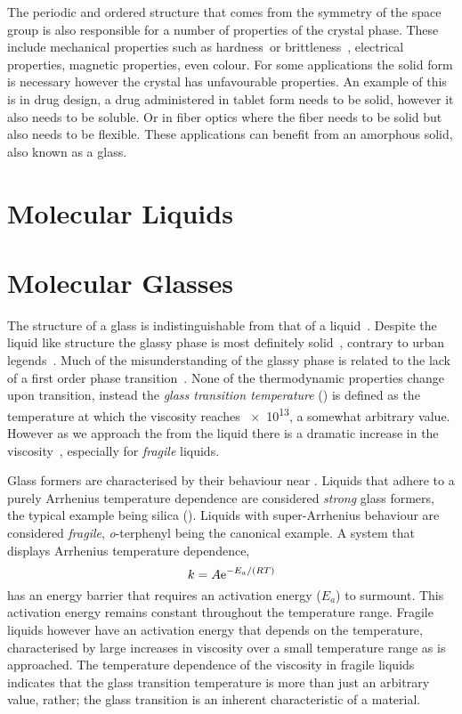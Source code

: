 
The periodic and ordered structure that comes from the symmetry of the space group is also responsible for a number of properties of the crystal phase. These include mechanical properties such as hardness~\tocite or brittleness~\tocite, electrical properties\tocite, magnetic properties\tocite, even colour\tocite. For some applications the solid form is necessary however the crystal has unfavourable properties. An example of this is in drug design, a drug administered in tablet form needs to be solid, however it also needs to be soluble\tocite. Or in fiber optics where the fiber needs to be solid but also needs to be flexible\tocite. These applications can benefit from an amorphous solid, also known as a glass.


\section{Molecular Liquids}






\section{Molecular Glasses}

The structure of a glass is indistinguishable from that of a liquid~\figref{}. Despite the liquid like structure the glassy phase is most definitely solid~\tocite, contrary to urban legends~\tocite. Much of the misunderstanding of the glassy phase is related to the lack of a first order phase transition~\tocite. None of the thermodynamic properties change upon transition, instead the \emph{glass transition temperature} (\si{\Tg}) is defined as the temperature at which the viscosity reaches \SI{e13}{\poise}, a somewhat arbitrary value. However as we approach the \si{\Tg} from the liquid there is a dramatic increase in the viscosity~\figref{}, especially for \emph{fragile} liquids.

Glass formers are characterised by their behaviour near \si{\Tg}. Liquids that adhere to a purely Arrhenius temperature dependence are considered \emph{strong} glass formers, the typical example being silica (). Liquids with super-Arrhenius behaviour are considered \emph{fragile}, \emph{o}-terphenyl being the canonical example. A system that displays Arrhenius temperature dependence,
\begin{equation}
    k = A \text{e}^{-E_a/(RT)}
\end{equation}
has an energy barrier that requires an activation energy ($E_a$) to surmount. This activation energy remains constant throughout the temperature range. Fragile liquids however have an activation energy that depends on the temperature\tocite, characterised by large increases in viscosity over a small temperature range as \si{\Tg} is approached. The temperature dependence of the viscosity in fragile liquids indicates that the glass transition temperature is more than just an arbitrary value, rather; the glass transition is an inherent characteristic of a material.

